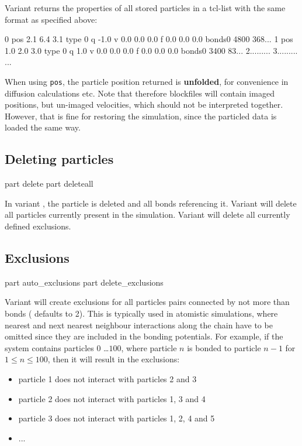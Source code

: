 Variant  returns the properties of all stored particles in
a tcl-list with the same format as specified above:
\begin{tclcode}
{0 pos 2.1 6.4 3.1 type 0 q -1.0 v 0.0 0.0 0.0 f 0.0 0.0 0.0
 bonds{{0 480}{0 368}...}} 
{1 pos 1.0 2.0 3.0 type 0 q 1.0 v 0.0 0.0 0.0 f 0.0 0.0 0.0
 bonds{{0 340}{0 83}...}} 
{2...{{...}...}}
{3...{{...}...}}
...
\end{tclcode}

When using \texttt{pos}, the particle position returned is {\bf
  unfolded}, for convenience in diffusion calculations etc.  Note that
therefore blockfiles will contain imaged positions, but un-imaged
velocities, which should not be interpreted together. However, that is
fine for restoring the simulation, since the particled data is loaded
the same way.

\subsection{Deleting  particles}
\label{tcl:part:delete}

\begin{essyntax}
   part  delete
   part deleteall
\end{essyntax}

In variant , the particle  is deleted
and all bonds referencing it.  Variant  will delete all
particles currently present in the simulation. Variant 
will delete all currently defined exclusions.

\subsection{Exclusions}

\begin{essyntax}
   part auto\_exclusions 
   part delete\_exclusions
  \begin{features}
  \end{features}
\end{essyntax}


Variant  will create exclusions for all particles pairs
connected by not more than  bonds ( defaults to
2). This is typically used in atomistic simulations, where nearest and
next nearest neighbour interactions along the chain have to be omitted
since they are included in the bonding potentials. For example, if the
system contains particles $0$ \dots $100$, where particle $n$ is
bonded to particle $n-1$ for $1 \leq n \leq 100$, then it will result
in the exclusions:
\begin{itemize}
  \item particle 1 does not interact with particles 2 and 3
  \item particle 2 does not interact with particles 1, 3 and 4
  \item particle 3 does not interact with particles 1, 2, 4 and 5
  \item ...
\end{itemize}

